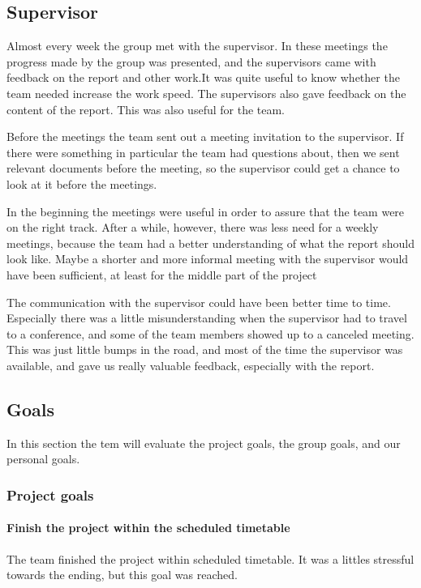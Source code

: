 \subsection{Supervisor}
Almost every week the group met with the supervisor. In these meetings the progress made by
the group was presented, and the supervisors came with feedback on the report and other
work.It was quite useful to know whether the team needed increase the work speed. 
The supervisors also gave feedback on the content of the report. This was also useful for the team.

Before the meetings the team sent out a meeting invitation to the supervisor.
If there were something in particular the team had questions about, then we sent relevant documents before the meeting, so the supervisor could get a chance to look at it before the meetings.

In the beginning the meetings were useful in order to assure that the team were on the right
track. After a while, however, there was less need for a weekly meetings, because the team had a better understanding of what the report should look like.
Maybe a shorter and more informal meeting with the supervisor would have been sufficient, at least for the
middle part of the project 

The communication with the supervisor could have been better time to time. Especially there was a little misunderstanding when the supervisor had to travel to a conference, and some of the team members showed up to a canceled meeting. This was just little bumps in the road, and most of the time the supervisor was available, and gave us really valuable feedback, especially with the report. 

\subsection{Goals} 
In this section the tem will evaluate the project goals, the group goals, and our personal goals. 

\subsubsection{Project goals}
\paragraph{Finish the project within the scheduled timetable}
The team finished the project within scheduled timetable. It was a littles stressful towards the ending, but this goal was reached.
